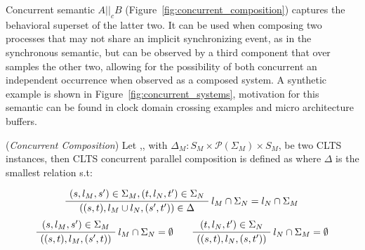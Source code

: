 Concurrent semantic $A ||_c B$ (Figure~\ref{fig:concurrent_composition}) captures the behavioral superset of the latter two. It can be used when composing two processes that may not share an implicit synchronizing event, as in the synchronous semantic, but can be observed by a third component that over samples the other two, allowing for the possibility of both concurrent an independent occurrence when observed as a composed system. A synthetic example is shown in Figure~\ref{fig:concurrent_systems}, motivation for this semantic can be found in clock domain crossing examples and micro architecture buffers.


\begin{definition} 
	\label{def:concurrent_composition}(\emph{Concurrent Composition})	Let ,, with $\Delta_M : S_M \times \mathcal{P}(\Sigma_M) \times S_M$, be two CLTS instances, then CLTS concurrent parallel composition is defined as  where $\Delta$ is the smallest relation s.t:
	\begin{center}
		\begin{equation}
		\AxiomC{$(s, l_M, s') \in \Sigma_M,(t, l_N, t') \in \Sigma_N  $}\RightLabel{$l_M \cap \Sigma_N = l_N \cap \Sigma_M$}
		\UnaryInfC{$((s,t),l_M \cup l_N,(s',t')) \in \Delta$}
		\DisplayProof
		\end{equation}	
		\begin{equation}
		\AxiomC{$(s, l_M, s') \in \Sigma_M $}\RightLabel{$l_M \cap \Sigma_N = \emptyset$}
		\UnaryInfC{$((s,t),l_M,(s',t))$}
		\DisplayProof
		\quad\quad
		\AxiomC{$(t, l_N, t') \in \Sigma_N $}\RightLabel{$l_N \cap \Sigma_M = \emptyset$}
		\UnaryInfC{$((s,t),l_N,(s,t'))$}
		\DisplayProof
		\end{equation}
	\end{center}
\end{definition}


%		 

